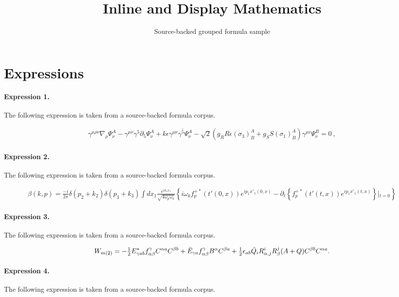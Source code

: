 \documentclass[11pt]{article}
\title{Inline and Display Mathematics}
\author{Source-backed grouped formula sample}
\date{}
\begin{document}
\maketitle
\section{Expressions}
\paragraph{Expression 1.} The following expression is taken from a source-backed formula corpus.

\begin{align*}\gamma^{\mu\rho\nu}\nabla_{\rho}\Psi_{\nu}^{A}-\gamma^{\mu\nu}\gamma^{5}\partial_{5}\Psi_{\nu}^{A}+k\epsilon\gamma^{\mu\nu}\gamma^{\hat{5}}\Psi_{\nu}^{A}-\sqrt{2}\left(g_{R}R\epsilon(\sigma_3)^{A}_{B}+g_{S}S(\sigma_1)^{A}_{B}\right)\gamma^{\mu\nu}\Psi_{\nu}^{B}=0\ ,\end{align*}

\paragraph{Expression 2.} The following expression is taken from a source-backed formula corpus.

\begin{align*}\beta(k,p)=\frac{-i}{2\pi}\delta(p_{2}+k_{2})\delta(p_{3}+k_{3})\int\! dx_1\frac{e^{ik_1x_1}}{\sqrt{4\omega_p\omega_k}}\left\{ i\omega_k f_p^{+\ast}(t'(0,x))e^{ip_1x'_1(0,x)}-\partial_t\left\{f_p^{+ \ast}(t'(t,x))e^{ip_1x'_1(t,x)} \right\}\left|_{t=0}\right.\right\}\end{align*}

\paragraph{Expression 3.} The following expression is taken from a source-backed formula corpus.

\begin{align*}W_{m(2)} = - \hbox{$\frac{1}{2}$} E_{\gamma ab}^* f^\gamma_{\alpha\beta}C^{\alpha a} C^{\beta b} +\bar{E}_{\gamma a} f^\gamma_{\alpha\beta} B^\alpha C^{\beta a} + \hbox{$\frac{1}{2}$} \epsilon_{ab} \bar{Q}_i R^i_{\alpha, j} R^j_\beta(A + Q) C^{\beta b} C^{\alpha a}.\end{align*}

\paragraph{Expression 4.} The following expression is taken from a source-backed formula corpus.
\end{document}
